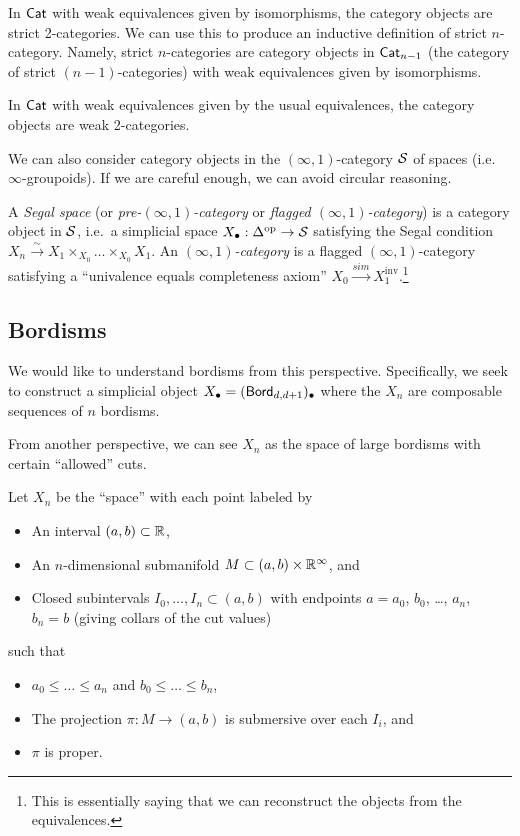 \begin{ex}
	In $\mathsf{Cat}$ with weak equivalences given by isomorphisms, the category objects are strict 2-categories.
	We can use this to produce an inductive definition of strict $n$-category.
	Namely, strict $n$-categories are category objects in $\mathsf{Cat}_{n-1}$ (the category of strict $(n-1)$-categories) with weak equivalences given by isomorphisms.
\end{ex}

\begin{ex}
	In $\mathsf{Cat}$ with weak equivalences given by the usual equivalences, the category objects are weak 2-categories.
\end{ex}

We can also consider category objects in the $(\infty, 1)$-category $\mathcal{S}$ of spaces (i.e.\ $\infty$-groupoids).
If we are careful enough, we can avoid circular reasoning.

\begin{dfn}
	A \emph{Segal space} (or \emph{pre-$(\infty, 1)$-category} or \emph{flagged $(\infty, 1)$-category}) is a category object in $\mathcal{S}$, i.e.\ a simplicial space $X_\bullet: \Delta^{\mathrm{op}} \to \mathcal{S}$ satisfying the Segal condition $X_n \xrightarrow{\sim} X_1 \times_{X_0} \dots \times_{X_0} X_1$.
	An \emph{$(\infty, 1)$-category} is a flagged $(\infty, 1)$-category satisfying a ``univalence equals completeness axiom'' $X_0 \xrightarrow{sim} X_1^{\textrm{inv}}$.\footnote{This is essentially saying that we can reconstruct the objects from the equivalences.}
\end{dfn}

\subsection{Bordisms}

We would like to understand bordisms from this perspective.
Specifically, we seek to construct a simplicial object $X_\bullet = (\mathsf{Bord}_{d,d+1})_\bullet$ where the $X_n$ are composable sequences of $n$ bordisms.

From another perspective, we can see $X_n$ as the space of large bordisms with certain ``allowed'' cuts.

\begin{dfn}
	Let $X_n$ be the ``space'' with each point labeled by
	\begin{itemize}
		\item An interval $(a, b) \subset \mathbb{R}$,
		\item An $n$-dimensional submanifold $M \subset (a, b) \times \mathbb{R}^{\infty}$, and
		\item Closed subintervals $I_0, \dots, I_n \subset (a, b)$ with endpoints $a = a_0$, $b_0$, \dots, $a_n$, $b_n = b$ (giving collars of the cut values)
	\end{itemize}
	such that
	\begin{itemize}
		\item $a_0 \leq \dots \leq a_n$ and $b_0 \leq \dots \leq b_n$,
		\item The projection $\pi: M \to (a, b)$ is submersive over each $I_i$, and
		\item $\pi$ is proper.
	\end{itemize}
\end{dfn}

